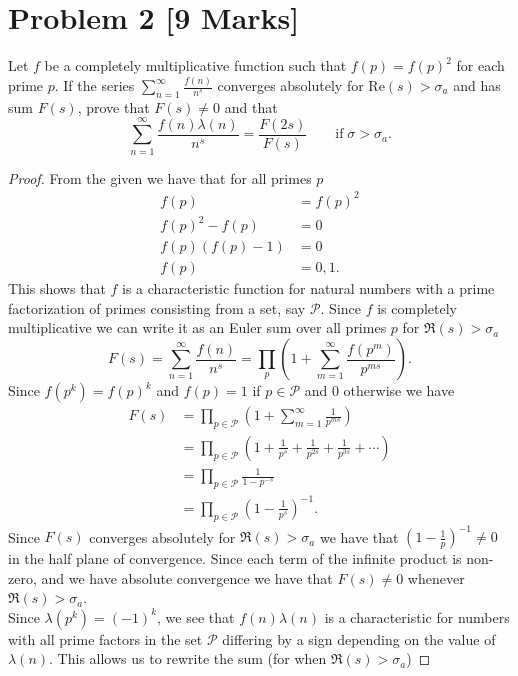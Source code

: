 \documentclass[12pt]{article}
\begin{document}
\section*{Problem 2 [9 Marks]}
Let $f$ be a completely multiplicative function such that $f(p)=f(p)^2$ for each prime $p$. If the series $\sum_{n=1}^{\infty}\frac{f(n)}{n^s}$ converges absolutely for $\mathrm{Re}(s)>\sigma_a$ and has sum $F(s)$, prove that $F(s)\neq0$ and that 
\[
    \sum_{n=1}^{\infty}\frac{f(n)\lambda(n)}{n^s}=\frac{F(2s)}{F(s)}\quad\quad\text{if}\;\sigma>\sigma_a.
\]
\begin{proof}
    From the given we have that for all primes $p$
    \begin{align*}
        f(p)&=f(p)^2\\
        f(p)^2-f(p)&=0\\
        f(p)(f(p)-1)&=0\\
        f(p)&=0,1.
    \end{align*}
    This shows that $f$ is a characteristic function for natural numbers with a prime factorization of primes consisting from a set, say $\mathcal{P}$. Since $f$ is completely multiplicative we can write it as an Euler sum over all primes $p$ for $\Re(s)>\sigma_a$
    \[
        F(s)=\sum_{n=1}^{\infty}\frac{f(n)}{n^s}=\prod_{p}\left(1+\sum_{m=1}^{\infty}\frac{f(p^m)}{p^{ms}}\right).
    \]
    Since $f(p^k)=f(p)^k$ and $f(p)=1$ if $p\in\mathcal{P}$ and 0 otherwise we have
    \begin{align*}
        F(s)&=\prod_{p\in\mathcal{P}}\left(1+\sum_{m=1}^{\infty}\frac{1}{p^{ms}}\right)\\
        &=\prod_{p\in\mathcal{P}}\left(1+\frac{1}{p^{s}}+\frac{1}{p^{2s}}+\frac{1}{p^{3s}}+\cdots\right)\\
        &=\prod_{p\in\mathcal{P}}\frac{1}{1-p^{-s}}\\
        &=\prod_{p\in\mathcal{P}}\left(1-\frac{1}{p^s}\right)^{-1}.
    \end{align*}
    Since $F(s)$ converges absolutely for $\Re(s)>\sigma_a$ we have that $\left(1-\frac{1}{p}\right)^{-1}\neq0$ in the half plane of convergence. Since each term of the infinite product is non-zero, and we have absolute convergence we have that $F(s)\neq0$ whenever $\Re(s)>\sigma_a$.\\
    Since $\lambda(p^k)=(-1)^k$, we see that $f(n)\lambda(n)$ is a characteristic for numbers with all prime factors in the set $\mathcal{P}$ differing by a sign depending on the value of $\lambda(n)$. This allows us to rewrite the sum (for when $\Re(s)>\sigma_a$)

\end{proof}
\end{document}
